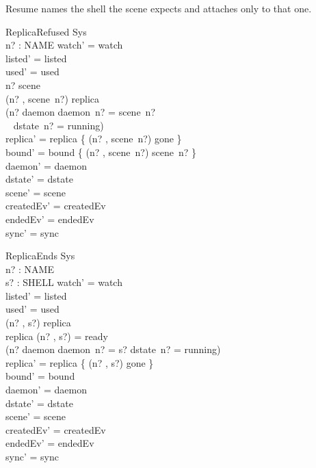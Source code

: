 \documentclass[a4paper,10pt,fleqn]{article}
\begin{document}
Resume names the shell the scene expects and attaches only to that one.

\begin{schema}{ReplicaRefused}
  \Delta Sys \\
  n? : NAME
\where
  watch' = watch \\
  listed' = listed \\
  used' = used \\
  n? \in \dom scene \\
  (n? , scene~n?) \notin \dom replica \\
  \lnot (n? \in \dom daemon \land daemon~n? = scene~n? \\
    \quad~ \land dstate~n? = running) \\
  replica' = replica \cup \{ (n? , scene~n?) \mapsto gone \} \\
  bound' = bound \cup \{ (n? , scene~n?) \mapsto scene~n? \} \\
  daemon' = daemon \\
  dstate' = dstate \\
  scene' = scene \\
  createdEv' = createdEv \\
  endedEv' = endedEv \\
  sync' = sync
\end{schema}

\begin{schema}{ReplicaEnds}
  \Delta Sys \\
  n? : NAME \\
  s? : SHELL
\where
  watch' = watch \\
  listed' = listed \\
  used' = used \\
  (n? , s?) \in \dom replica \\
  replica (n? , s?) = ready \\
  \lnot (n? \in \dom daemon \land daemon~n? = s? \land dstate~n? = running) \\
  replica' = replica \oplus \{ (n? , s?) \mapsto gone \} \\
  bound' = bound \\
  daemon' = daemon \\
  dstate' = dstate \\
  scene' = scene \\
  createdEv' = createdEv \\
  endedEv' = endedEv \\
  sync' = sync
\end{schema}
\end{document}
